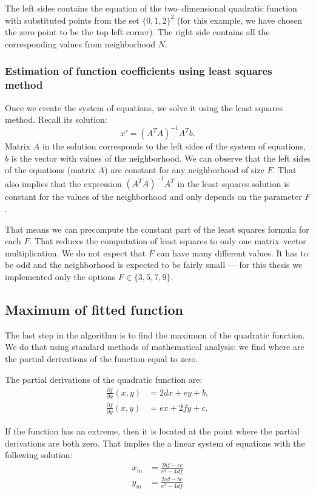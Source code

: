 The left sides contains the equation of the two--dimensional quadratic function with substituted points from the set $\{0,1,2\}^2$ (for this example, we have chosen the zero point to be the top left corner). The right side contains all the corresponding values from neighborhood $N$.

\subsubsection{Estimation of function coefficients using least squares method}
\label{estimation}

Once we create the system of equations, we solve it using the least squares method. Recall its solution:
\[
x' = (A^TA)^{-1}A^Tb.
\]
Matrix $A$ in the solution corresponds to the left sides of the system of equations, $b$ is the vector with values of the neighborhood. We can observe that the left sides of the equations (matrix $A$) are constant for any neighborhood of size $F$. That also implies that the expression $(A^TA)^{-1}A^T$ in the least squares solution is constant for the values of the neighborhood and only depends on the parameter $F$.

That means we can precompute the constant part of the least squares formula for each $F$. That reduces the computation of least squares to only one matrix--vector multiplication. We do not expect that $F$ can have many different values. It has to be odd and the neighborhood is expected to be fairly small --- for this thesis we implemented only the options $F \in \{3, 5, 7, 9\}$.


\subsection{Maximum of fitted function}

The last step in the algorithm is to find the maximum of the quadratic function. We do that using standard methods of mathematical analysis: we find where are the partial derivations of the function equal to zero.

The partial derivations of the quadratic function are:
\begin{align*}
\frac{\partial f}{\partial x}(x,y) &= 2dx + ey + b,\\
\frac{\partial f}{\partial y}(x,y) &= ex + 2fy + c.
\end{align*}

If the function has an extreme, then it is located at the point where the partial derivations are both zero. That implies the a linear system of equations with the following solution:
\begin{align*}
x_m &= \frac{2bf - ce}{e^2 - 4df}\\
y_m &= \frac{2cd - be}{e^2 - 4df}
\end{align*}

